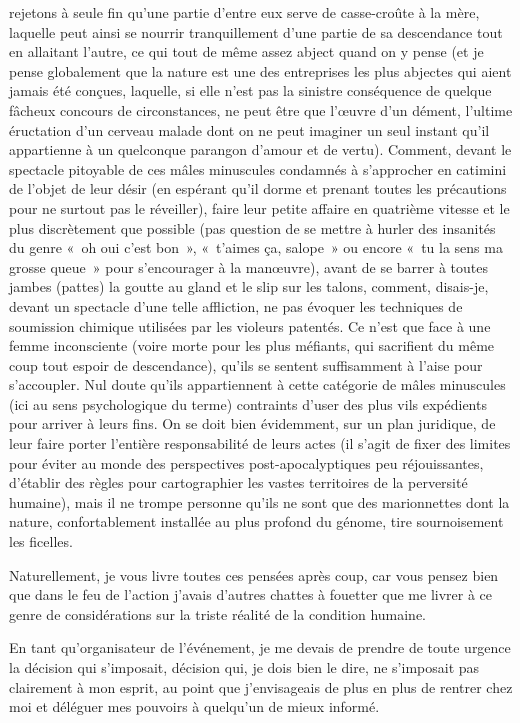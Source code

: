 rejetons à seule fin qu’une partie d’entre eux serve de casse-croûte à la mère, laquelle peut ainsi se nourrir tranquillement d’une partie de sa descendance tout en allaitant l’autre, ce qui tout de même assez abject quand on y pense (et je pense globalement que la nature est une des entreprises les plus abjectes qui aient jamais été conçues, laquelle, si elle n’est pas la sinistre conséquence de quelque fâcheux concours de circonstances, ne peut être que l’œuvre d’un dément, l’ultime éructation d’un cerveau malade dont on ne peut imaginer un seul instant qu’il appartienne à un quelconque parangon d’amour et de vertu). Comment, devant le spectacle pitoyable de ces mâles minuscules condamnés à s’approcher en catimini de l’objet de leur désir (en espérant qu’il dorme et prenant toutes les précautions pour ne surtout pas le réveiller), faire leur petite affaire en quatrième vitesse et le plus discrètement que possible (pas question de se mettre à hurler des insanités du genre «~oh oui c’est bon~», «~t’aimes ça, salope~» ou encore «~tu la sens ma grosse queue~» pour s’encourager à la manœuvre), avant de se barrer à toutes jambes (pattes) la goutte au gland et le slip sur les talons, comment, disais-je, devant un spectacle d’une telle affliction, ne pas évoquer les techniques de soumission chimique utilisées par les violeurs patentés. Ce n’est que face à une femme inconsciente (voire morte pour les plus méfiants, qui sacrifient du même coup tout espoir de descendance), qu’ils se sentent suffisamment à l’aise pour s’accoupler. Nul doute qu’ils appartiennent à cette catégorie de mâles minuscules (ici au sens psychologique du terme) contraints d’user des plus vils expédients pour arriver à leurs fins. On se doit bien évidemment, sur un plan juridique, de leur faire porter l’entière responsabilité de leurs actes (il s’agit de fixer des limites pour éviter au monde des perspectives post-apocalyptiques peu réjouissantes, d’établir des règles pour cartographier les vastes territoires de la perversité humaine), mais il ne trompe personne qu’ils ne sont que des marionnettes dont la nature, confortablement installée au plus profond du génome, tire sournoisement les ficelles.

Naturellement, je vous livre toutes ces pensées après coup, car vous pensez bien que dans le feu de l’action j’avais d’autres chattes à fouetter que me livrer à ce genre de considérations sur la triste réalité de la condition humaine.

En tant qu’organisateur de l’événement, je me devais de prendre de toute urgence la décision qui s’imposait, décision qui, je dois bien le dire, ne s’imposait pas clairement à mon esprit, au point que j’envisageais de plus en plus de rentrer chez moi et déléguer mes pouvoirs à quelqu’un de mieux informé.

